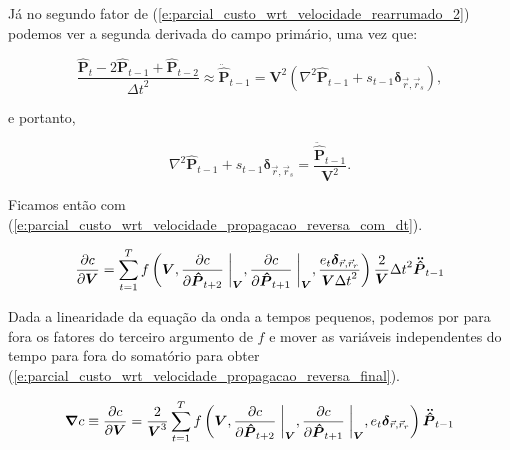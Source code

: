   Já no segundo fator de (\ref{e:parcial_custo_wrt_velocidade_rearrumado_2}) podemos ver a segunda derivada do campo primário, uma vez que:

  \begin{equation} \label{e:de_volta_das_diferencas_finitas_para_segunda_derivada_analitica}
    \frac{\boldsymbol{\hat{P}}_t - 2 \boldsymbol{\hat{P}}_{t-1} + \boldsymbol{\hat{P}}_{t-2}}{{\Delta t}^2}
    \approx
    \boldsymbol{\ddot{\hat{P}}}_{t-1}
    =
    \boldsymbol{V}^2 (\nabla^2 \boldsymbol{\hat{P}}_{t-1} + s_{t-1} \boldsymbol{\delta}_{\vec{r}, \vec{r}_s})
    ,
  \end{equation}

  \noindent e portanto,

  \begin{equation} \label{e:segundo_fator_vem_da_segunda_derivada_no_tempo}
    \nabla^2 \boldsymbol{\hat{P}}_{t-1} + s_{t-1} \boldsymbol{\delta}_{\vec{r}, \vec{r}_s}
    =
    \frac{\boldsymbol{\ddot{\hat{P}}}_{t-1}}{\boldsymbol{V}^2}
    .
  \end{equation}

  \noindent Ficamos então com (\ref{e:parcial_custo_wrt_velocidade_propagacao_reversa_com_dt}).

  \begin{equation} \label{e:parcial_custo_wrt_velocidade_propagacao_reversa_com_dt}
    \frac{\partial c}{\partial \boldsymbol{V}} =
    \sum \limits_{t=1}^T
    f\left(\boldsymbol{V},
      \frac{\partial c}{\partial \boldsymbol{\hat{P}}_{t+2}} \biggm\lvert_{\boldsymbol{V}}, \frac{\partial c}{\partial \boldsymbol{\hat{P}}_{t+1}} \biggm\lvert_{\boldsymbol{V}}, \frac{e_t \boldsymbol{\delta}_{\vec{r}, \vec{r}_r}}{\boldsymbol{V} {\Delta t}^2}
    \right)
    \frac{2}{\boldsymbol{V}} {\Delta t}^2 \boldsymbol{\ddot{\hat{P}}}_{t-1}
  \end{equation}

  Dada a linearidade da equação da onda a tempos pequenos, podemos por para fora os fatores do terceiro argumento de $f$ e mover as variáveis independentes do tempo para fora do somatório para obter (\ref{e:parcial_custo_wrt_velocidade_propagacao_reversa_final}).

  \begin{equation} \label{e:parcial_custo_wrt_velocidade_propagacao_reversa_final}
    \boldsymbol{\nabla} c \equiv \frac{\partial c}{\partial \boldsymbol{V}} =
    \frac{2}{\boldsymbol{V}^3}
    \sum \limits_{t=1}^T
    f\left(\boldsymbol{V},
      \frac{\partial c}{\partial \boldsymbol{\hat{P}}_{t+2}} \biggm\lvert_{\boldsymbol{V}}, \frac{\partial c}{\partial \boldsymbol{\hat{P}}_{t+1}} \biggm\lvert_{\boldsymbol{V}}, e_t \boldsymbol{\delta}_{\vec{r}, \vec{r}_r}
    \right)
    \boldsymbol{\ddot{\hat{P}}}_{t-1}
  \end{equation}

